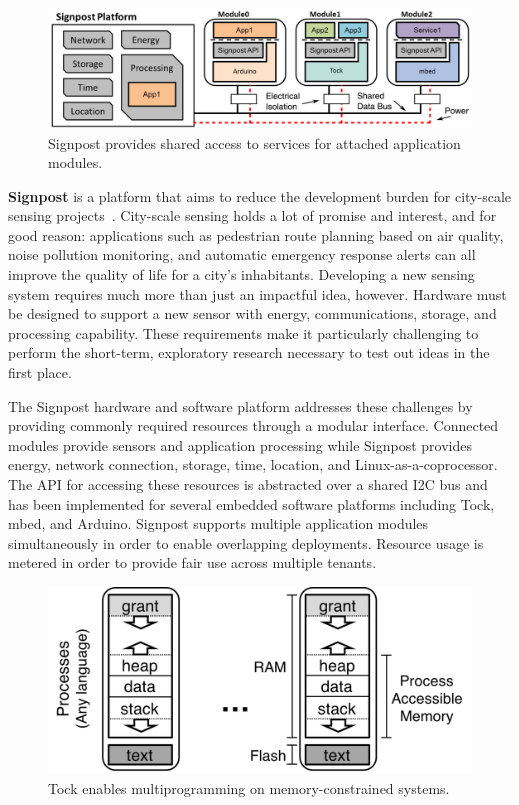 \documentclass[11pt]{article} %
\begin{document}
\begin{figure}
  \vspace{-1em}
  \centering
  \includegraphics[width=0.59\columnwidth]{signpost_software_revised}
  \caption*{\sffamily \scriptsize
    Signpost provides shared access to services for attached application modules.
  }
  \label{fig:signpost}
  \vspace{-1em}
\end{figure}

\textbf{Signpost} is a platform that aims to reduce the development burden for city-scale sensing
projects~\cite{adkins18signpost}. City-scale sensing holds a lot of
promise and interest, and for good reason: applications such as pedestrian
route planning based on air quality, noise pollution monitoring, and automatic
emergency response alerts can all improve the quality of life for a city's
inhabitants. Developing a new sensing system requires much more than just an
impactful idea, however. Hardware must be designed to support a new sensor with
energy, communications, storage, and processing capability. These requirements
make it particularly challenging to perform the short-term, exploratory research
necessary to test out ideas in the first place.

The Signpost hardware and software platform addresses these challenges by
providing commonly required resources through a modular interface. Connected
modules provide sensors and application processing while Signpost provides
energy, network connection, storage, time, location, and
Linux-as-a-coprocessor.
%
The API for accessing these resources is abstracted
over a shared I2C bus and has been implemented for several embedded software
platforms including Tock, mbed, and Arduino.
%
Signpost supports multiple application modules simultaneously in order to
enable overlapping deployments. Resource usage is metered in order to provide
fair use across multiple tenants.

\begin{figure}
  \centering
  \includegraphics[width=0.49\columnwidth]{memory_layout}
  \caption*{\sffamily \scriptsize
   Tock enables multiprogramming on memory-constrained systems.
  }
  \label{fig:tock}
  \vspace{-1em}
\end{figure}
\end{document}
